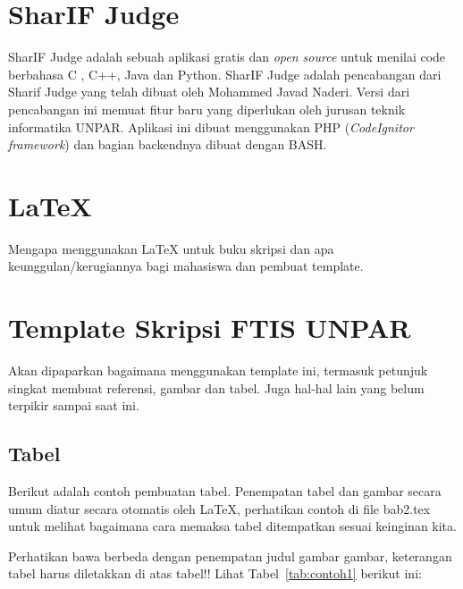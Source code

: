 \section{SharIF Judge}
SharIF Judge adalah sebuah aplikasi gratis dan \textit{open source} untuk menilai code berbahasa C , C++, Java dan Python. SharIF Judge adalah pencabangan dari Sharif Judge yang telah dibuat oleh Mohammed Javad Naderi. Versi dari pencabangan ini memuat fitur baru yang diperlukan oleh jurusan teknik informatika UNPAR. Aplikasi ini dibuat menggunakan PHP (\textit{CodeIgnitor framework}) dan bagian backendnya dibuat dengan BASH.

\section{\LaTeX}
\label{sec:latex}

Mengapa menggunakan \LaTeX{} untuk buku skripsi dan apa keunggulan/kerugiannya bagi mahasiswa dan pembuat template. 



\section{Template Skripsi FTIS UNPAR}
\label{sec:template}
 
Akan dipaparkan bagaimana menggunakan template ini, termasuk petunjuk singkat membuat referensi, gambar dan tabel.
Juga hal-hal lain yang belum terpikir sampai saat ini. 
 

\subsection{Tabel}  
Berikut adalah contoh pembuatan tabel. 
Penempatan tabel dan gambar secara umum diatur secara otomatis oleh \LaTeX{}, perhatikan contoh di file bab2.tex untuk melihat bagaimana cara memaksa tabel ditempatkan sesuai keinginan kita.

Perhatikan bawa berbeda dengan penempatan judul gambar gambar, keterangan tabel harus diletakkan di atas tabel!!
Lihat Tabel~\ref{tab:contoh1} berikut ini:

